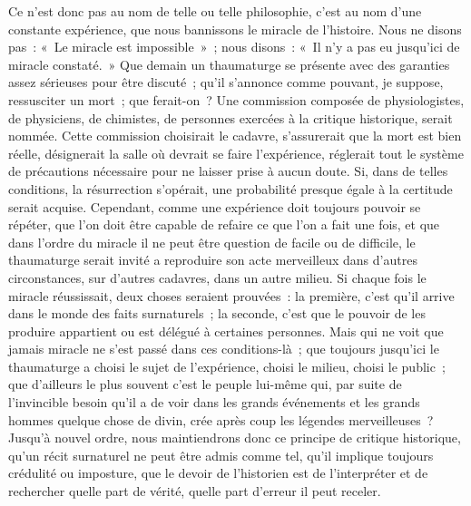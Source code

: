 \documentclass[french,twoside]{book} %
\begin{document}
Ce n’est donc pas au nom de telle ou telle philosophie, c’est au nom d’une constante expérience, que nous bannissons le miracle de l’histoire. Nous ne disons pas : « Le miracle est impossible » ; nous disons : « Il n’y a pas eu jusqu’ici de miracle constaté. » Que demain un thaumaturge se présente avec des garanties assez sérieuses pour être discuté ; qu’il s’annonce comme pouvant, je suppose, ressusciter un mort ; que ferait-on ? Une commission composée de physiologistes, de physiciens, de chimistes, de personnes exercées à la critique historique, serait nommée. Cette commission choisirait le cadavre, s’assurerait que la mort est bien réelle, désignerait la salle où devrait se faire l’expérience, réglerait tout le système de précautions nécessaire pour ne laisser prise à aucun doute. Si, dans de telles conditions, la résurrection s’opérait, une probabilité presque égale à la certitude serait acquise. Cependant, comme une expérience doit toujours pouvoir se répéter, que l’on doit être capable de refaire ce que l’on a fait une fois, et que dans l’ordre du miracle il ne peut être question de facile ou de difficile, le thaumaturge serait invité a reproduire son acte merveilleux dans d’autres circonstances, sur d’autres cadavres, dans un autre milieu. Si chaque fois le miracle réussissait, deux choses seraient prouvées : la première, c’est qu’il arrive dans le monde des faits surnaturels ; la seconde, c’est que le pouvoir de les produire appartient ou est délégué à certaines personnes. Mais qui ne voit que jamais miracle ne s’est passé dans ces conditions-là ; que toujours jusqu’ici le thaumaturge a choisi le sujet de l’expérience, choisi le milieu, choisi le public ; que d’ailleurs le plus souvent c’est le peuple lui-même qui, par suite de l’invincible besoin qu’il a de voir dans les grands événements et les grands hommes quelque chose de divin, crée après coup les légendes merveilleuses ? Jusqu’à nouvel ordre, nous maintiendrons donc ce principe de critique historique, qu’un récit surnaturel ne peut être admis comme tel, qu’il implique toujours crédulité ou imposture, que le devoir de l’historien est de l’interpréter et de rechercher quelle part de vérité, quelle part d’erreur il peut receler.\par
\end{document}
